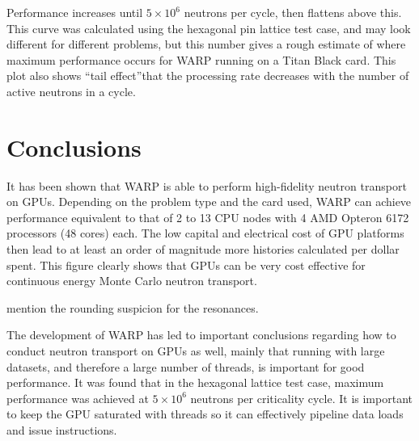 \documentclass[preprint,12pt]{elsarticle}
\begin{document}
Performance increases until $5\times10^6$ neutrons per cycle, then flattens above this.  This curve was calculated using the hexagonal pin lattice test case, and may look different for different problems, but this number gives a rough estimate of where maximum performance occurs for WARP running on a Titan Black card.  This plot also shows ``tail effect''\textemdash that the processing rate decreases with the number of active neutrons in a cycle.  


\section{Conclusions}
\label{sec:conc}

It has been shown that WARP is able to perform high-fidelity neutron transport on GPUs.  Depending on the problem type and the card used, WARP can achieve performance equivalent to that of 2 to 13 CPU nodes with 4 AMD Opteron 6172 processors (48 cores) each.  The low capital and electrical cost of GPU platforms then lead to at least an order of magnitude more histories calculated per dollar spent.  This figure clearly shows that GPUs can be  very cost effective for continuous energy Monte Carlo neutron transport.

mention the rounding suspicion for the resonances.

The development of WARP has led to important conclusions regarding how to conduct neutron transport on GPUs as well, mainly that running with large datasets, and therefore a large number of threads, is important for good performance.  It was found that in the hexagonal lattice test case, maximum performance was achieved at $5\times10^6$ neutrons per criticality cycle.  It is important to keep the GPU saturated with threads so it can effectively pipeline data loads and issue instructions.  
\end{document}
